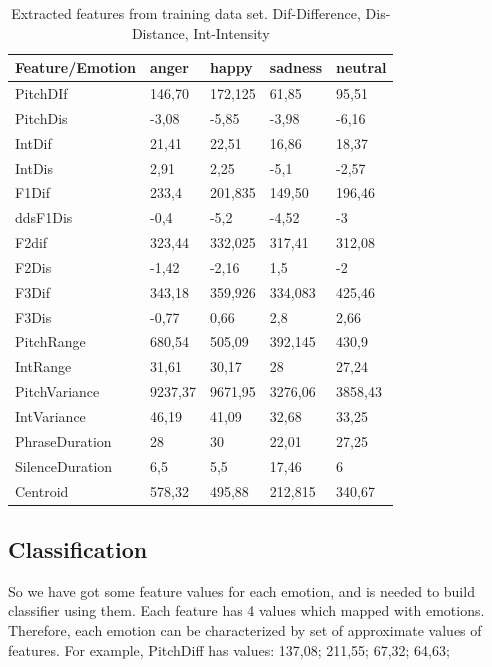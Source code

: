 \documentclass[14pt]{extarticle}
\begin{document}
\begin{table}[h]
	\centering
		\begin{tabular}{l|l|l|l|l|}
			\hline
				Feature/Emotion& anger&	happy	&sadness	&neutral\\ \hline
PitchDIf        & 146,70  & 172,125      & 61,85    & 95,51  \\ \hline
PitchDis        & -3,08 & -5,85 & -3,98 & -6,16 \\ \hline
IntDif          & 21,41  & 22,51      & 16,86  & 18,37  \\ \hline
IntDis          & 2,91 & 2,25         & -5,1         & -2,57 \\ \hline
F1Dif           & 233,4  & 201,835      & 149,50  & 196,46  \\ \hline
ddsF1Dis        & -0,4         & -5,2         & -4,52 & -3           \\ \hline
F2dif           & 323,44       & 332,025     & 317,41     & 312,08  \\ \hline
F2Dis           & -1,42 & -2,16 & 1,5          & -2           \\ \hline
F3Dif           & 343,18       & 359,926      & 334,083      & 425,46       \\ \hline
F3Dis           & -0,77 & 0,66  & 2,8          & 2,66  \\ \hline
PitchRange      & 680,54       & 505,09       & 392,145      & 430,9        \\ \hline
IntRange        & 31,61        & 30,17        & 28           & 27,24        \\ \hline
PitchVariance   & 9237,37  & 9671,95  & 3276,06  & 3858,43  \\ \hline
IntVariance     & 46,19  & 41,09  & 32,68  & 33,25  \\ \hline
PhraseDuration  & 28           & 30           & 22,01  & 27,25        \\ \hline
SilenceDuration & 6,5          & 5,5          & 17,46  & 6            \\ \hline
Centroid        & 578,32       & 495,88       & 212,815      & 340,67       \\ \hline
 \hline
		\end{tabular}
	\caption{Extracted features from training data set. Dif-Difference, Dis-Distance, Int-Intensity}
	\label{tab:ExtractedFeaturesFromTrainingDataSet}
\end{table}

\subsection{Classification}
So we have got some feature values for each emotion, and is needed to build classifier using them. Each feature has 4 values which mapped with emotions. Therefore, each emotion can be characterized by set of approximate values of features. For example, PitchDiff has values: 	137,08;  211,55; 67,32; 64,63; 
\end{document}
